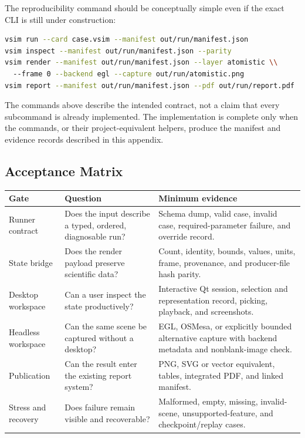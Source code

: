 \documentclass[11pt,a4paper]{article}
\begin{document}
The reproducibility command should be conceptually simple even if the exact
CLI is still under construction:

\begin{lstlisting}[language=bash,title={\textbf{Target evidence sequence}}]
vsim run --card case.vsim --manifest out/run/manifest.json
vsim inspect --manifest out/run/manifest.json --parity
vsim render --manifest out/run/manifest.json --layer atomistic \\
  --frame 0 --backend egl --capture out/run/atomistic.png
vsim report --manifest out/run/manifest.json --pdf out/run/report.pdf
\end{lstlisting}

The commands above describe the intended contract, not a claim that every
subcommand is already implemented.  The implementation is complete only when
the commands, or their project-equivalent helpers, produce the manifest and
evidence records described in this appendix.

\subsection{Acceptance Matrix}

\begin{center}
\small
\begin{tabular}{p{3.0cm}p{4.8cm}p{5.8cm}}
\toprule
\textbf{Gate} & \textbf{Question} & \textbf{Minimum evidence} \\
\midrule
Runner contract & Does the input describe a typed, ordered, diagnosable run? &
Schema dump, valid case, invalid case, required-parameter failure, and
override record. \\
State bridge & Does the render payload preserve scientific data? & Count,
identity, bounds, values, units, frame, provenance, and producer-file hash
parity. \\
Desktop workspace & Can a user inspect the state productively? & Interactive
Qt session, selection and representation record, picking, playback, and
screenshots. \\
Headless workspace & Can the same scene be captured without a desktop? & EGL,
OSMesa, or explicitly bounded alternative capture with backend metadata and
nonblank-image check. \\
Publication & Can the result enter the existing report system? & PNG, SVG or
vector equivalent, tables, integrated PDF, and linked manifest. \\
Stress and recovery & Does failure remain visible and recoverable? & Malformed,
empty, missing, invalid-scene, unsupported-feature, and checkpoint/replay
cases. \\
\bottomrule
\end{tabular}
\end{center}
\end{document}

